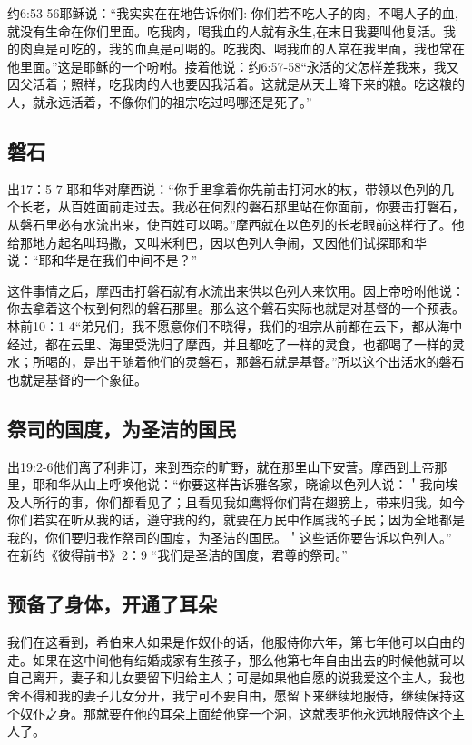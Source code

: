 约6:53-56耶稣说：“我实实在在地告诉你们: 你们若不吃人子的肉，不喝人子的血,就没有生命在你们里面。吃我肉，喝我血的人就有永生,在末日我要叫他复活。我的肉真是可吃的，我的血真是可喝的。吃我肉、喝我血的人常在我里面，我也常在他里面。”这是耶稣的一个吩咐。接着他说：约6:57-58“永活的父怎样差我来，我又因父活着；照样，吃我肉的人也要因我活着。这就是从天上降下来的粮。吃这粮的人，就永远活着，不像你们的祖宗吃过吗哪还是死了。”

\subsection{磐石}
出17：5-7 耶和华对摩西说：“你手里拿着你先前击打河水的杖，带领以色列的几个长老，从百姓面前走过去。我必在何烈的磐石那里站在你面前，你要击打磐石，从磐石里必有水流出来，使百姓可以喝。”摩西就在以色列的长老眼前这样行了。他给那地方起名叫玛撒，又叫米利巴，因以色列人争闹，又因他们试探耶和华说：“耶和华是在我们中间不是？”

这件事情之后，摩西击打磐石就有水流出来供以色列人来饮用。因上帝吩咐他说：你去拿着这个杖到何烈的磐石那里。那么这个磐石实际也就是对基督的一个预表。林前10：1-4“弟兄们，我不愿意你们不晓得，我们的祖宗从前都在云下，都从海中经过，都在云里、海里受洗归了摩西，并且都吃了一样的灵食，也都喝了一样的灵水；所喝的，是出于随着他们的灵磐石，那磐石就是基督。”所以这个出活水的磐石也就是基督的一个象征。


\subsection{祭司的国度，为圣洁的国民}
出19:2-6他们离了利非订，来到西奈的旷野，就在那里山下安营。摩西到上帝那里，耶和华从山上呼唤他说：“你要这样告诉雅各家，晓谕以色列人说：＇我向埃及人所行的事，你们都看见了；且看见我如鹰将你们背在翅膀上，带来归我。如今你们若实在听从我的话，遵守我的约，就要在万民中作属我的子民；因为全地都是我的，你们要归我作祭司的国度，为圣洁的国民。＇这些话你要告诉以色列人。” 在新约《彼得前书》2：9 “我们是圣洁的国度，君尊的祭司。”

\subsection{预备了身体，开通了耳朵}
我们在这看到，希伯来人如果是作奴仆的话，他服侍你六年，第七年他可以自由的走。如果在这中间他有结婚成家有生孩子，那么他第七年自由出去的时候他就可以自己离开，妻子和儿女要留下归给主人；可是如果他自愿的说我爱这个主人，我也舍不得和我的妻子儿女分开，我宁可不要自由，愿留下来继续地服侍，继续保持这个奴仆之身。那就要在他的耳朵上面给他穿一个洞，这就表明他永远地服侍这个主人了。

